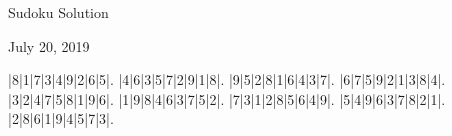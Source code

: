\documentclass{article}
\begin{document}
\begin{center}
\Huge{Sudoku Solution}
\end{center}
\begin{center}
\Large{July 20, 2019}
\end{center}
\begin{sudoku}
|8|1|7|3|4|9|2|6|5|.
|4|6|3|5|7|2|9|1|8|.
|9|5|2|8|1|6|4|3|7|.
|6|7|5|9|2|1|3|8|4|.
|3|2|4|7|5|8|1|9|6|.
|1|9|8|4|6|3|7|5|2|.
|7|3|1|2|8|5|6|4|9|.
|5|4|9|6|3|7|8|2|1|.
|2|8|6|1|9|4|5|7|3|.
\end{sudoku}
\end{document}
